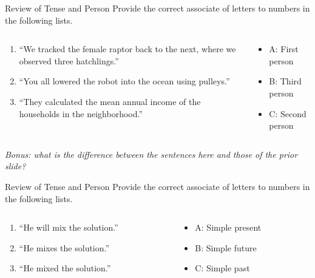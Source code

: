 \documentclass{beamer}
\begin{document}
\begin{frame}{Review of Tense and Person}
\small
\alert{Provide the correct associate of letters to numbers in the following lists.}
\begin{columns}[T]
\begin{column}{0.5\textwidth}
\begin{enumerate}
\item ``We tracked the female raptor back to the next, where we observed three hatchlings.''
\item ``You all lowered the robot into the ocean using pulleys.''
\item ``They calculated the mean annual income of the households in the neighborhood.''
\end{enumerate}
\end{column}
\begin{column}{0.5\textwidth}
\begin{itemize}
\item A: First person
\item B: Third person
\item C: Second person
\end{itemize}
\end{column}
\end{columns}
\textit{Bonus: what is the difference between the sentences here and those of the prior slide?}
\end{frame}

\begin{frame}{Review of Tense and Person}
\small
\alert{Provide the correct associate of letters to numbers in the following lists.}
\begin{columns}[T]
\begin{column}{0.5\textwidth}
\begin{enumerate}
\item ``He will mix the solution.''
\item ``He mixes the solution.''
\item ``He mixed the solution.''
\end{enumerate}
\end{column}
\begin{column}{0.5\textwidth}
\begin{itemize}
\item A: Simple present
\item B: Simple future
\item C: Simple past
\end{itemize}
\end{column}
\end{columns}
\end{frame}
\end{document}

